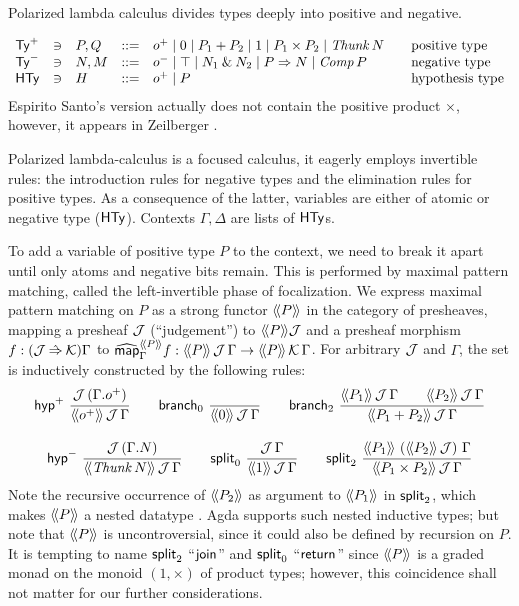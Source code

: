 \documentclass[a4paper,USenglish,cleveref, autoref]{lipics-v2019}
\begin{document}
Polarized lambda calculus \cite{espiritoSanto:entcs17}
divides types deeply into positive and negative.

\[
\begin{array}{lllrl@{\qquad}l}
  \PTy & \ni & P,Q & ::= & \patom
    \mid \tyzero \mid P_1 + P_2
    \mid \tyone \mid P_1 \times P_2
    \mid \Thunk N
  & \mbox{positive type}
\\
  \NTy & \ni & N,M & ::= & \natom
    \mid \top \mid N_1 \ntimes N_2
    \mid P \To N
    \mid \Comp P
  & \mbox{negative type}
\\
  \HTy & \ni & H & ::= & \patom \mid P
  & \mbox{hypothesis type}
\\
\end{array}
\]
Espirito Santo's version actually does not contain the positive
product $\times$, however, it appears in Zeilberger
\cite{zeilberger:PhD}.

Polarized lambda-calculus is a focused calculus, it eagerly employs
invertible rules: the introduction rules for negative types and the
elimination rules for positive types.  As a consequence of the latter,
variables are either of atomic or negative type ($\HTy$).
Contexts $\Gamma,\Delta$ are lists of $\HTy$s.

To add a variable of positive type $P$ to the context, we need to
break it apart until only atoms and negative bits remain.  This is
performed by maximal pattern matching, called the left-invertible
phase of focalization.
We express maximal pattern matching on $P$ as a strong functor
$\Add P$ in the category of presheaves,
mapping a presheaf $\J$ (``judgement'') to $\Add P \J$
and a presheaf morphism $f : (\J \hatto \K)\Gamma$ to
$\stmap[\Add P]_\Gamma f : \AddHyp P \J \Gamma \to \AddHyp P \K \Gamma$.
For arbitrary $\J$ and $\Gamma$, the set  is
inductively constructed by the following rules:
\begin{gather*}
  \nru{\phyp}
      {\J\,(\cext \Gamma \patom)}
      {\AddHyp {\patom} \J \Gamma}
\qquad
  \nru{\nbranch}
      {}
      {\AddHyp {\tyzero} \J \Gamma}
\qquad
  \nru{\bbranch}
      {\AddHyp {P_1} \J \Gamma \qquad
       \AddHyp {P_2} \J \Gamma }
      {\AddHyp {P_1 + P_2} \J \Gamma}
\\[2ex]
  \nru{\nhyp}
      {\J\,(\cext \Gamma N)}
      {\AddHyp {\Thunk N} \J \Gamma}
\qquad
  \nru{\nsplit}
      {\J\,\Gamma}
      {\AddHyp {\tyone} \J \Gamma}
\qquad
  \nru{\bsplit}
      {\AddHyp {P_1} {\left(\Add{P_2}\,\J\right)} \Gamma}
      {\AddHyp {P_1 \times P_2} \J \Gamma}
\end{gather*}
Note the recursive occurrence of $\Add{P_2}$ as argument to
$\Add{P_1}$ in $\bsplit$, which makes $\Add P$ a nested datatype
\cite{bird:nested}.  Agda supports such nested inductive types; but
note that $\Add{P}$ is uncontroversial, since it could also be defined
by recursion on $P$.   It is tempting to name $\bsplit$
``$\tjoin$'' and $\nsplit$ ``$\treturn$''
since $\Add P$ is a graded monad on the monoid $(1,\times)$
of product types;
however, this coincidence shall not matter for our further considerations.
\end{document}
